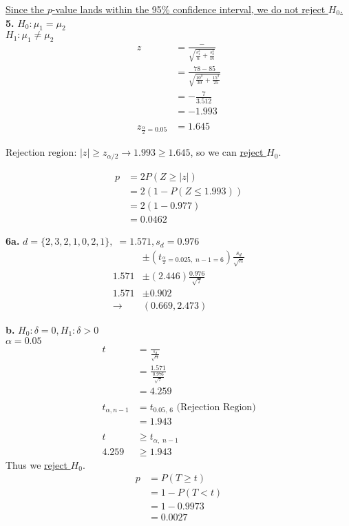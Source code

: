 \documentclass[12pt]{report}
\makeatletter
\newcommand*{\Xbar}{}%
\DeclareRobustCommand*{\Xbar}{%
	\mathpalette\@Xbar{}%
}
\newcommand*{\@Xbar}[2]{%
	\sbox0{$#1\mathrm{X}\m@th$}%
	\sbox2{$#1X\m@th$}%
	\rlap{%
		\hbox to\wd2{%
			\hfill
			$\overline{%
				\vrule width 0pt height\ht0 %
				\kern\wd0 %
			}$%
		}%
	}%
	\copy2 %
}
\newcommand*{\Ybar}{}%
\DeclareRobustCommand*{\Ybar}{%
	\mathpalette\@Ybar{}%
}
\newcommand*{\@Ybar}[2]{%
	\sbox0{$#1\mathrm{Y}\m@th$}%
	\sbox2{$#1Y\m@th$}%
	\rlap{%
		\hbox to\wd2{%
			\hfill
			$\overline{%
				\vrule width 0pt height\ht0 %
				\kern\wd0 %
			}$%
		}%
	}%
	\copy2 %
}
\newcommand*{\dbar}{}%
\DeclareRobustCommand*{\dbar}{%
	\mathpalette\@dbar{}%
}
\newcommand*{\@dbar}[2]{%
	\sbox0{$#1\mathrm{d}\m@th$}%
	\sbox2{$#1d\m@th$}%
	\rlap{%
		\hbox to\wd2{%
			\hfill
			$\overline{%
				\vrule width 0pt height\ht0 %
				\kern\wd0 %
			}$%
		}%
	}%
	\copy2 %
}
\makeatother
\begin{document}
\noindent \underline{Since the $p$-value lands within the 95\% confidence interval, we do not reject $H_0$.}\\

\noindent \textbf{5.} $H_0 : \mu_1 = \mu_2$\\
$H_1 : \mu_1 \neq \mu_2$
\begin{align*}
	z &= \frac{\Xbar - \Ybar}{\sqrt{\frac{s_1^2}{n} + \frac{s_2^2}{m}}}\\
	&= \frac{78-85}{\sqrt{\frac{10^2}{30} + \frac{15^2}{25}}}\\
	&= -\frac{7}{3.512}\\
	&= \boxed{-1.993}\\\\
	z_{\frac{\alpha}{2} = 0.05} &= 1.645
\end{align*}

\noindent Rejection region: $|z| \geq z_{\alpha/2} \rightarrow 1.993 \geq 1.645$, so we can \underline{reject $H_0$}.

\begin{align*}
	p &= 2P(Z \geq |z|)\\
	&= 2(1 - P(Z \leq 1.993))\\
	&= 2(1 - 0.977)\\
	&= \boxed{0.0462}
\end{align*}

\noindent \textbf{6a.} $d = \{2, 3, 2, 1, 0, 2, 1\},\; \dbar = 1.571, s_d = 0.976$\\

\begin{align*}
	\dbar &\pm (t_{\frac{\alpha}{2}=0.025,\;n-1=6})\frac{s_d}{\sqrt{n}}\\
	1.571 &\pm (2.446)\frac{0.976}{\sqrt{7}}\\
	1.571 &\pm 0.902\\
	\rightarrow& \boxed{(0.669, 2.473)}
\end{align*}

\noindent \textbf{b.} $H_0 : \delta = 0, H_1 : \delta > 0$\\
$\alpha = 0.05$
\begin{align*}
	t &= \frac{\dbar}{\frac{s_d}{\sqrt{n}}}\\
	&= \frac{1.571}{\frac{0.976}{\sqrt{7}}}\\
	&= 4.259\\\\
	t_{\alpha, n-1} &= t_{0.05,\,6} \text{ (Rejection Region)}\\
	&= 1.943\\\\
	t &\geq t_{\alpha,\;n-1}\\
	4.259 &\geq 1.943
\end{align*}
\noindent Thus we \underline{reject $H_0$}.
\begin{align*}
	p &= P(T \geq t)\\
	&= 1 - P(T < t)\\
	&= 1 - 0.9973\\
	&= \boxed{0.0027}
\end{align*}
\end{document}
